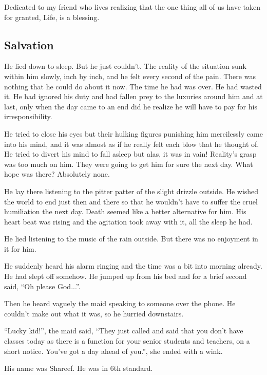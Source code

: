 \documentclass[twoside,11pt,titlepage]{article}
\begin{document}
Dedicated to my friend who lives realizing that the one thing all of us have taken for granted, Life, is a blessing.

\newpage

\begin{center}
  \section{Salvation}
\end{center}
\bigskip
\bigskip
\bigskip

He lied down to sleep. But he just couldn't. The reality of the situation sunk within him slowly, inch by inch, and he felt every second of the pain. There was nothing that he could do about it now. The time he had was over. He had wasted it. He had ignored his duty and had fallen prey to the luxuries around him and at last, only when the day came to an end did he realize he will have to pay for his irresponsibility.

He tried to close his eyes but their hulking figures punishing him mercilessly came into his mind, and it was almost as if he really felt each blow that he thought of. He tried to divert his mind to fall asleep but alas, it was in vain! Reality's grasp was too much on him. They were going to get him for sure the next day. What hope was there? Absolutely none.

He lay there listening to the pitter patter of the slight drizzle outside. He wished the world to end just then and there so that he wouldn't have to suffer the cruel humiliation the next day. Death seemed like a better alternative for him. His heart beat was rising and the agitation took away with it, all the sleep he had.

He lied listening to the music of the rain outside. But there was no enjoyment in it for him.

He suddenly heard his alarm ringing and the time was a bit into morning already. He had slept off somehow. He jumped up from his bed and for a brief second said, ``Oh please God...''.

Then he heard vaguely the maid speaking to someone over the phone. He couldn't make out what it was, so he hurried downstairs.

``Lucky kid!'', the maid said, ``They just called and said that you don't have classes today as there is a function for your senior students and teachers, on a short notice. You've got a day ahead of you.'', she ended with a wink.

His name was Shareef. He was in 6th standard.
\end{document}
